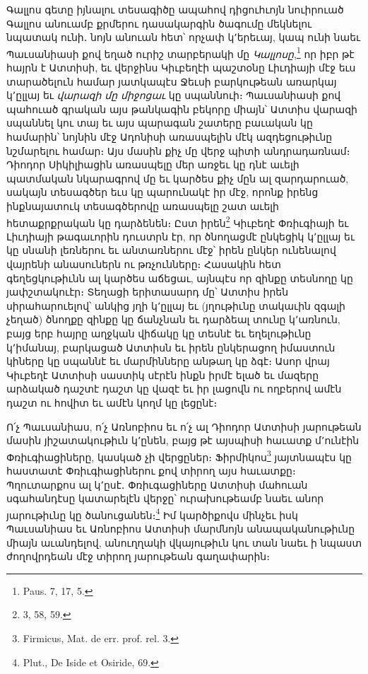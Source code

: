 \documentclass{article}
\begin{document}
{Գալլոս գետը իյնալու տեսագիծը ապահով դիցուհւոյն նուիրուած Գալլոս անուամբ քրմերու դասակարգին ծագումը մեկնելու նպատակ ունի․ նոյն անուան հետ՝ որչափ կ՚երեւայ, կապ ունի նաեւ Պաւսանիասի քով եղած ուրիշ տարբերակի մը \emph{Կալլոսը},\footnote{Paus. 7, 17, 5.} որ իբր թէ հայրն է Ատտիսի, եւ վերջինս Կիւբեղէի պաշտօնը Լիւդիայի մէջ եւս տարածելուն համար յատկապէս Ջեւսի բարկութեան առարկայ կ՚ըլլայ եւ \emph{վարազի մը միջոցաւ} կը սպաննուի։ Պաւսանիասի քով պահուած գրական այս թանկագին բեկորը միայն՝ Ատտիս վարազի սպաննել կու տայ եւ այս պարագան շատերը բաւական կը համարին՝ նոյնին մէջ Ադոնիսի առասպելին մէկ ազդեցութիւնը նշմարելու համար։ Այս մասին քիչ մը վերջ պիտի անդրադառնամ։ Դիոդոր Սիկիլիացին առասպելը մեր առջեւ կը դնէ աւելի պատմական նկարագրով մը եւ կարծես քիչ մըն ալ զարդարուած, սակայն տեսագծեր եւս կը պարունակէ իր մէջ, որոնք իրենց ինքնայատուկ տեսագծերովը առասպելը շատ աւելի հետաքրքրական կը դարձենեն։ Ըստ իրեն\footnote{3, 58, 59.} Կիւբեղէ Փռիւգիայի եւ Լիւդիայի թագաւորին դուստրն էր, որ ծնողացմէ ընկեցիկ կ՚ըլլայ եւ կը սնանի լեռներու եւ անտառներու մէջ՝ իրեն ընկեր ունենալով վայրենի անասուներն ու թռչունները։ Հասակին հետ գեղեցկութիւնն ալ կարծես աճեցաւ, այնպէս որ զինքը տեսնողը կը յափշտակուէր։ Տեղացի երիտասարդ մը՝ Ատտիս իրեն սիրահարուելով՝ անկից յղի կ՚ըլլայ եւ (յղութիւնը տակաւին զգալի չեղած) ծնողքը զինքը կը ճանչնան եւ դարձեալ տունը կ՚առնուն, բայց երբ հայրը աղջկան վիճակը կը տեսնէ եւ եղելութիւնը կ՚իմանայ, բարկացած Ատտիսն եւ իրեն ընկերացող իմաստուն կիները կը սպաննէ եւ մարմինները անթաղ կը ձգէ։ Ասոր վրայ Կիւբեղէ Ատտիսի սաստիկ սէրէն ինքն իրմէ ելած եւ մազերը արձակած դաշտէ դաշտ կը վազէ եւ իր լացովն ու ողբերով ամէն դաշտ ու հովիտ եւ ամէն կողմ կը լեցընէ։

Ո՛չ Պաւսանիաս, ո՛չ Առնոբիոս եւ ո՛չ ալ Դիոդոր Ատտիսի յարութեան մասին յիշատակութիւն կ՚ընեն, բայց թէ այսպիսի հաւատք մ՚ունէին Փռիւգիացիները, կասկած չի վերցըներ։ Ֆիրմիկոս\footnote{Firmicus, Mat. de err. prof. rel. 3.} յայտնապէս կը հաստատէ Փռիւգիացիներու քով տիրող այս հաւատքը։ Պղուտարքոս ալ կ՚ըսէ․ Փռիւգացիները Ատտիսի մահուան սգահանդէսը կատարելէն վերջը՝ ուրախութեամբ նաեւ անոր յարութիւնը կը ծանուցանեն։\footnote{Plut., De Iside et Osiride, 69.} Իմ կարծիքովս մինչեւ իսկ Պաւսանիաս եւ Առնոբիոս Ատտիսի մարմնոյն անապականութիւնը միայն աւանդելով, անուղղակի վկայութիւն կու տան նաեւ ի նպաստ ժողովրդեան մէջ տիրող յարութեան գաղափարին։

}
\end{document}
